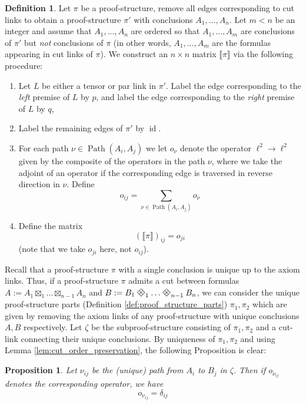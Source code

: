 \documentclass[12pt]{article}
\theoremstyle{plain}
\newtheorem{proposition}[thm]{Proposition}
\theoremstyle{definition}
\newtheorem{defn}[thm]{Definition} %
\newcommand{\lto}{\longrightarrow}
\DeclareRobustCommand{\diamondtimes}{%
  \mathbin{\text{\rotatebox[origin=c]{45}{$\boxplus$}}}%
}
\begin{document}
\begin{defn}
Let $\pi$ be a proof-structure, remove all edges corresponding to cut links to obtain a proof-structure $\pi'$ with conclusions $A_1,...,A_n$.  Let $m < n$ be an integer and assume that $A_1,...,A_n$ are ordered so that $A_1,...,A_m$ are conclusions of $\pi'$ but \emph{not} conclusions of $\pi$ (in other words, $A_1,...,A_m$ are the formulas appearing in cut links of $\pi$).  We construct an $n \times n$ matrix $\llbracket \pi \rrbracket$ via the following procedure:
\begin{enumerate}
\item Let $L$ be either a tensor or par link in $\pi'$. Label the edge corresponding to the \emph{left} premise of $L$ by $p$, and label the edge corresponding to the \emph{right} premise of $L$ by $q$,
\item Label the remaining edges of $\pi'$ by $\operatorname{id}$.
\item For each path $\nu \in \operatorname{Path}(A_i,A_j)$ we let $o_\nu$ denote the operator $\ell^2 \lto \ell^2$ given by the composite of the operators in the path $\nu$, where we take the adjoint of an operator if the corresponding edge is traversed in reverse direction in $\nu$. Define 
$$o_{ij} = \sum_{\nu \in \operatorname{Path}(A_i,A_j)}o_\nu$$
\item Define the matrix
\begin{equation}
(\llbracket \pi \rrbracket)_{ij} = o_{ji}
\end{equation}
(note that we take $o_{ji}$ here, not $o_{ij}$).
\end{enumerate}
\end{defn}
Recall that a proof-structure $\pi$ with a single conclusion is unique up to the axiom links. Thus, if a proof-structure $\pi$ admits a cut between formulas $A := A_1 \boxtimes_1 \hdots \boxtimes_{n-1} A_n$ and $B:=B_1 \diamondtimes_1 \hdots \diamondtimes_{n-1} B_n$, we can consider the unique proof-structure parts (Definition \ref{def:proof_structure_parts}) $\pi_1,\pi_2$ which are given by removing the axiom links of any proof-structure with unique conclusions $A,B$ respectively.  Let $\zeta$ be the subproof-structure consisting of $\pi_1,\pi_2$ and a cut-link connecting their unique conclusions. By uniqueness of $\pi_1,\pi_2$ and using Lemma \ref{lem:cut_order_preservation}, the following Proposition is clear:
\begin{proposition}\label{prop:main_GoI_prop}
Let $\nu_{ij}$ be the (unique) path from $A_i$ to $B_j$ in $\zeta$. Then if $o_{\nu_{ij}}$ denotes the corresponding operator, we have
\begin{equation}
o_{\nu_{ij}} = \delta_{ij}
\end{equation}
\end{proposition}
\end{document}
